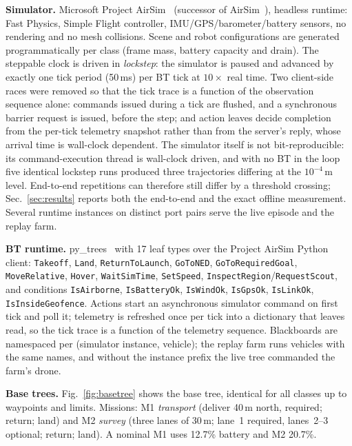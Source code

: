 \documentclass[conference]{IEEEtran}
\begin{document}
\textbf{Simulator.} Microsoft Project AirSim~\cite{projectairsim} (successor of AirSim~\cite{shah2017airsim}), headless runtime: Fast Physics, Simple Flight controller, IMU/GPS/barometer/battery sensors, no rendering and no mesh collisions. Scene and robot configurations are generated programmatically per class (frame mass, battery capacity and drain). The steppable clock is driven in \emph{lockstep}: the simulator is paused and advanced by exactly one tick period (50\,ms) per BT tick at $10\times$ real time. Two client-side races were removed so that the tick trace is a function of the observation sequence alone: commands issued during a tick are flushed, and a synchronous barrier request is issued, before the step; and action leaves decide completion from the per-tick telemetry snapshot rather than from the server's reply, whose arrival time is wall-clock dependent. The simulator itself is not bit-reproducible: its command-execution thread is wall-clock driven, and with no BT in the loop five identical lockstep runs produced three trajectories differing at the $10^{-4}$\,m level. End-to-end repetitions can therefore still differ by a threshold crossing; Sec.~\ref{sec:results} reports both the end-to-end and the exact offline measurement. Several runtime instances on distinct port pairs serve the live episode and the replay farm.

\textbf{BT runtime.} py\_trees~\cite{pytrees} with 17 leaf types over the Project AirSim Python client: \texttt{Takeoff}, \texttt{Land}, \texttt{ReturnToLaunch}, \texttt{GoToNED}, \texttt{GoToRequiredGoal}, \texttt{MoveRelative}, \texttt{Hover}, \texttt{WaitSimTime}, \texttt{SetSpeed}, \texttt{InspectRegion}/\texttt{RequestScout}, and conditions \texttt{IsAirborne}, \texttt{IsBatteryOk}, \texttt{IsWindOk}, \texttt{IsGpsOk}, \texttt{IsLinkOk}, \texttt{IsInsideGeofence}. Actions start an asynchronous simulator command on first tick and poll it; telemetry is refreshed once per tick into a dictionary that leaves read, so the tick trace is a function of the telemetry sequence. Blackboards are namespaced per (simulator instance, vehicle); the replay farm runs vehicles with the same names, and without the instance prefix the live tree commanded the farm's drone.

\textbf{Base trees.} Fig.~\ref{fig:basetree} shows the base tree, identical for all classes up to waypoints and limits. Missions: M1 \emph{transport} (deliver 40\,m north, required; return; land) and M2 \emph{survey} (three lanes of 30\,m; lane~1 required, lanes~2--3 optional; return; land). A nominal M1 uses 12.7\% battery and M2 20.7\%.
\end{document}
